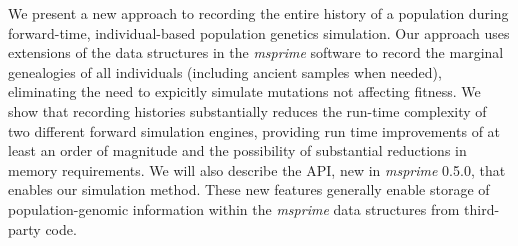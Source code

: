 \documentclass{article}
\begin{document}
We present a new approach to recording the entire history of a population during forward-time, individual-based
population genetics simulation.  Our approach uses extensions of the data structures in the \emph{msprime} software to
record the marginal genealogies of all individuals (including ancient samples when needed), eliminating the need to
expicitly simulate mutations not affecting fitness.  We show that recording histories substantially reduces the run-time
complexity of two different forward simulation engines, providing run time improvements of at least an order of
magnitude and the possibility of substantial reductions in memory requirements.  We will also describe the API, new in
\emph{msprime} 0.5.0, that enables our simulation method.  These new features generally enable storage of
population-genomic information within the \emph{msprime} data structures from third-party code.
\end{document}
